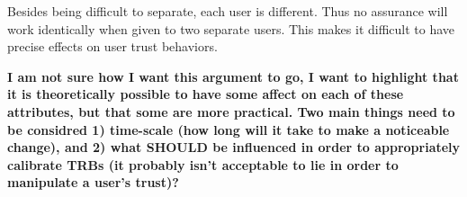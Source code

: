         Besides being difficult to separate, each user is different. Thus no assurance will work identically when given to two separate users. This makes it difficult to have precise effects on user trust behaviors.

        \textbf{I am not sure how I want this argument to go, I want to highlight that it is theoretically possible to have some affect on each of these attributes, but that some are more practical. Two main things need to be considred 1) time-scale (how long will it take to make a noticeable change), and 2) what SHOULD be influenced in order to appropriately calibrate TRBs (it probably isn't acceptable to lie in order to manipulate a user's trust)?}
